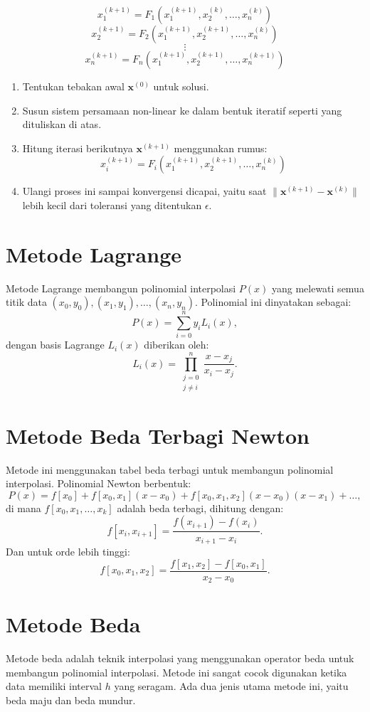 \documentclass[a4paper,extrafontsizes, 9pt]{memoir}
\begin{document}
\begin{multicols}{3}
\[
x_1^{(k+1)} = F_1(x_1^{(k+1)}, x_2^{(k)}, \dots, x_n^{(k)})
\]
\[
x_2^{(k+1)} = F_2(x_1^{(k+1)}, x_2^{(k+1)}, \dots, x_n^{(k)})
\]
\[
\vdots
\]
\[
x_n^{(k+1)} = F_n(x_1^{(k+1)}, x_2^{(k+1)}, \dots, x_n^{(k+1)})
\]
\begin{enumerate}
    \item Tentukan tebakan awal \( \mathbf{x}^{(0)} \) untuk solusi.
    \item Susun sistem persamaan non-linear ke dalam bentuk iteratif seperti yang dituliskan di atas.
    \item Hitung iterasi berikutnya \( \mathbf{x}^{(k+1)} \) menggunakan rumus:
    \[
    x_i^{(k+1)} = F_i(x_1^{(k+1)}, x_2^{(k+1)}, \dots, x_n^{(k)})
    \]
    \item Ulangi proses ini sampai konvergensi dicapai, yaitu saat \( \|\mathbf{x}^{(k+1)} - \mathbf{x}^{(k)}\| \) lebih kecil dari toleransi yang ditentukan \( \epsilon \).
\end{enumerate}
\newpage
\section*{\small Metode Lagrange}
Metode Lagrange membangun polinomial interpolasi \( P(x) \) yang melewati semua titik data \( (x_0, y_0), (x_1, y_1), \dots, (x_n, y_n) \). Polinomial ini dinyatakan sebagai:
\[
P(x) = \sum_{i=0}^{n} y_i L_i(x),
\]
dengan basis Lagrange \( L_i(x) \) diberikan oleh:
\[
L_i(x) = \prod_{\substack{j=0 \\ j \neq i}}^{n} \frac{x - x_j}{x_i - x_j}.
\]

\section*{\small Metode Beda Terbagi Newton}
Metode ini menggunakan tabel beda terbagi untuk membangun polinomial interpolasi. Polinomial Newton berbentuk:
\[
P(x) = f[x_0] + f[x_0, x_1](x - x_0) + f[x_0, x_1, x_2](x - x_0)(x - x_1) + \dots,
\]
di mana \( f[x_0, x_1, \dots, x_k] \) adalah beda terbagi, dihitung dengan:
\[
f[x_i, x_{i+1}] = \frac{f(x_{i+1}) - f(x_i)}{x_{i+1} - x_i}.
\]
Dan untuk orde lebih tinggi:
\[
f[x_0, x_1, x_2] = \frac{f[x_1, x_2] - f[x_0, x_1]}{x_2 - x_0}.
\]

\section*{\small Metode Beda}
Metode beda adalah teknik interpolasi yang menggunakan operator beda untuk membangun polinomial interpolasi. Metode ini sangat cocok digunakan ketika data memiliki interval \( h \) yang seragam. Ada dua jenis utama metode ini, yaitu beda maju dan beda mundur.


\end{multicols}
\end{document}
